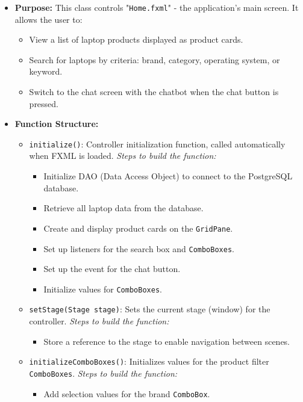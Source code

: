 \documentclass{article}
\begin{document}
\begin{itemize}
    \item \textbf{Purpose:} This class controls "\texttt{Home.fxml}" - the application's main screen. It allows the user to:
    \begin{itemize}
        \item View a list of laptop products displayed as product cards.
        \item Search for laptops by criteria: brand, category, operating system, or keyword.
        \item Switch to the chat screen with the chatbot when the chat button is pressed.
    \end{itemize}
    \item \textbf{Function Structure:}
    \begin{itemize}
        \item \texttt{initialize()}: Controller initialization function, called automatically when FXML is loaded.
        \subitem \textit{Steps to build the function:}
        \begin{itemize}
            \item Initialize DAO (Data Access Object) to connect to the PostgreSQL database.
            \item Retrieve all laptop data from the database.
            \item Create and display product cards on the \texttt{GridPane}.
            \item Set up listeners for the search box and \texttt{ComboBoxes}.
            \item Set up the event for the chat button.
            \item Initialize values for \texttt{ComboBoxes}.
        \end{itemize}
        \item \texttt{setStage(Stage stage)}: Sets the current stage (window) for the controller.
        \subitem \textit{Steps to build the function:}
        \begin{itemize}
            \item Store a reference to the stage to enable navigation between scenes.
        \end{itemize}
        \item \texttt{initializeComboBoxes()}: Initializes values for the product filter \texttt{ComboBoxes}.
        \subitem \textit{Steps to build the function:}
        \begin{itemize}
            \item Add selection values for the brand \texttt{ComboBox}.

\end{itemize}
\end{itemize}
\end{itemize}
\end{document}
